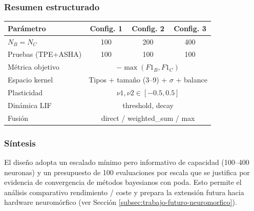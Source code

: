 \subsubsection{Resumen estructurado}
\begin{center}
\begin{tabular}{lccc}
\hline
Parámetro & Config. 1 & Config. 2 & Config. 3 \\
\hline
$N_B = N_C$ & 100 & 200 & 400 \\
Pruebas (TPE+ASHA) & 100 & 100 & 100 \\
Métrica objetivo & \multicolumn{3}{c}{$-\max(F1_B,F1_C)$} \\
Espacio kernel & \multicolumn{3}{c}{Tipos + tamaño (3--9) + $\sigma$ + balance} \\
Plasticidad & \multicolumn{3}{c}{$\nu1,\nu2 \in [-0.5,0.5]$} \\
Dinámica LIF & \multicolumn{3}{c}{threshold, decay} \\
Fusión & \multicolumn{3}{c}{direct / weighted\_sum / max} \\
\hline
\end{tabular}
\end{center}

\subsubsection{Síntesis}
El diseño adopta un escalado mínimo pero informativo de capacidad (100–400 neuronas) y un presupuesto de 100 evaluaciones por escala que se justifica por evidencia de convergencia de métodos bayesianos con poda. Esto permite el análisis comparativo rendimiento / coste y prepara la extensión futura hacia hardware neuromórfico (ver Sección \ref{subsec:trabajo-futuro-neuromorfico}).



